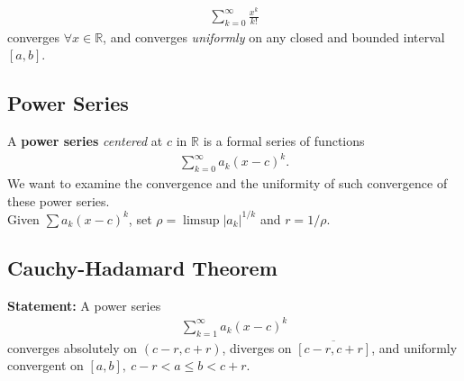 \documentclass[10pt]{extarticle}
\newcommand{\R}{\mathbb{R}}
\begin{document}
    \begin{align*}
      \sum_{k=0}^{\infty}\frac{x^k}{k!}
    \end{align*}
    converges $\forall x\in\R$, and converges \textit{uniformly} on any closed and bounded interval $[a,b]$.
  \subsection{Power Series}%
    A \textbf{power series} \textit{centered} at $c$ in $\R$ is a formal series of functions
    \begin{align*}
      \sum_{k=0}^{\infty} a_k(x-c)^k.
    \end{align*}
    We want to examine the convergence and the uniformity of such convergence of these power series.\\

    Given $\sum a_k(x-c)^k$, set $\rho = \limsup|a_k|^{1/k}$ and $r = 1/\rho$.
  \subsection{Cauchy-Hadamard Theorem}%
    \textbf{Statement:} A power series
    \begin{align*}
      \sum_{k=1}^{\infty} a_k(x-c)^k
    \end{align*}
    converges absolutely on $(c-r,c+r)$, diverges on $\overline{[c-r,c+r]}$, and uniformly convergent on $[a,b],~c-r < a \leq b < c + r$.\\
\end{document}
